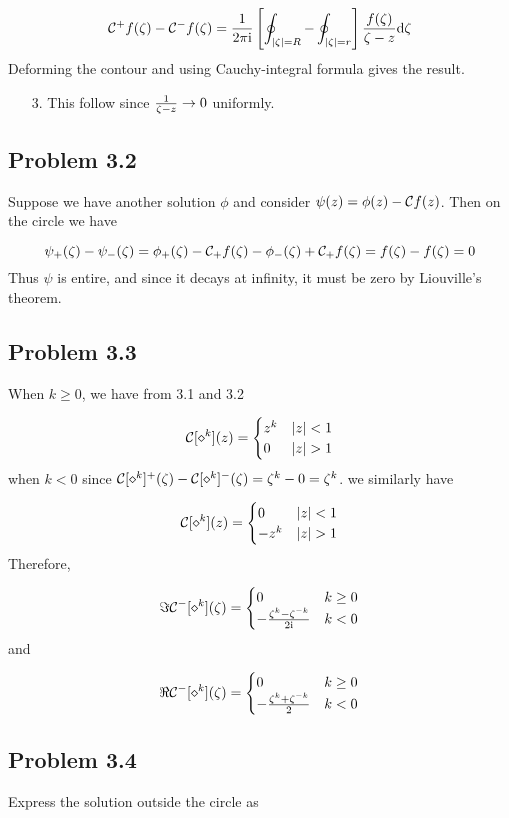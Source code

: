 \documentclass[12pt,landscape]{article}
\def\D{ {\rm d} }
\def\I{ {\rm i} }
\def\CC{ {\cal C} }
\begin{document}
{\[
\CC^+ f(\zeta) - \CC^- f(\zeta) = {1 \over 2 \pi \I} \left[\oint_{|\zeta| = R} - \oint_{|\zeta| = r} \right] {f(\zeta) \over \zeta -z} \D\zeta
\]
Deforming the contour and using Cauchy-integral formula gives the result.

\begin{itemize}
\item[3. ] This follow since ${1 \over \zeta - z} \rightarrow 0$ uniformly.

\end{itemize}
\subsection{Problem 3.2}
Suppose we have another solution $\phi$ and consider $\psi(z) = \phi(z) - \CC f(z)$. Then on the circle we have

\[
\psi_+(\zeta) - \psi_-(\zeta) = \phi_+(\zeta) - \CC_+f(\zeta) - \phi_-(\zeta) + \CC_+f(\zeta) = f(\zeta)-f(\zeta) = 0
\]
Thus $\psi$ is entire, and since it decays at infinity, it must be zero by Liouville's theorem.

\subsection{Problem 3.3}
When $k \geq 0$, we have from 3.1 and 3.2

\[
\CC[\diamond^k](z) =\begin{cases}
    z^k  & |z| < 1 \\
    0 & |z| > 1
    \end{cases}
\]
when $k < 0$ since $\CC[\diamond^k]^+(\zeta) - \CC[\diamond^k]^-(\zeta) = \zeta^k - 0 = \zeta^k$. we similarly have

\[
\CC[\diamond^k](z) =\begin{cases}
0  & |z| < 1 \\
    -z^k & |z| > 1
        \end{cases}
\]
Therefore,

\[
\Im \CC^-[\diamond^k](\zeta) =\begin{cases}
0  & k \geq 0 \\
    -{\zeta^k - \zeta^{-k} \over 2 \I} & k < 0
        \end{cases}
\]
and

\[
\Re \CC^-[\diamond^k](\zeta) =\begin{cases}
0  & k \geq 0 \\
    -{\zeta^k + \zeta^{-k} \over 2} & k < 0
        \end{cases}
\]
\subsection{Problem 3.4}
Express the solution outside the circle as

}
\end{document}
